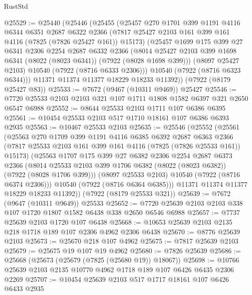 \begin{lexlean}{RustStd}
\begin{coremodule}
@25529 := @25440
    (@25446
      (@25455
        (@25457
          @270
          @1701
          @399
          @1191
          @4116
          @6344
          @6351
          @2687
          @6322
          @2366
          (@7817 @25427 @2103 @161 @399 @161 @4116 (@7825 (@7826 @25427 @161)) @15173)
          (@25457
            @1699
            @175
            @399
            @27
            @6341
            @2306
            @2254
            @2687
            @6332
            @2366
            (@8014 @25427 @2103 @399 @1698 @6341 (@8022 (@8023 @6341)) (@7922 (@8028 @1698 @399)))
            (@8097 @25427 @2103)
            @10540
            (@7922 (@8716 @6333 @2306)))
          @10540
          (@7922 (@8716 @6323 @6344)))
        @11371
        @11374
        @11377
        @18229
        @18233
        @11392))
    (@7922 (@8179 @25427 @83))
@25533 := @7672 (@9467 (@10311 @9469)) @25427
@25546 := @7720 @25533 @2103 @2103 @321 @107 @1711 @1808 @1582 @6397 @321 @2650 @6547 @6988
@25552 := @8644 @25533 @2103 @1711 @107 @6386 @6395
@25561 := @10454 @25533 @2103 @517 @1710 @18161 @107 @6386 @6393 @2935
@25563 := @10467 @25533 @2103
@25635 := @25546
    (@25552
      (@25561
        (@25563
          @270
          @1709
          @399
          @1191
          @4116
          @6385
          @6392
          @2687
          @6363
          @2366
          (@7817 @25533 @2103 @161 @399 @161 @4116 (@7825 (@7826 @25533 @161)) @15173)
          (@25563
            @1707
            @175
            @399
            @27
            @6382
            @2306
            @2254
            @2687
            @6373
            @2366
            (@8014 @25533 @2103 @399 @1706 @6382 (@8022 (@8023 @6382)) (@7922 (@8028 @1706 @399)))
            (@8097 @25533 @2103)
            @10540
            (@7922 (@8716 @6374 @2306)))
          @10540
          (@7922 (@8716 @6364 @6385)))
        @11371
        @11374
        @11377
        @18229
        @18233
        @11392))
    (@7922 (@8179 @25533 @321))
@25639 := @7672 (@9647 (@10311 @9649)) @25533
@25652 := @7720 @25639 @2103 @2103 @338 @107 @1720 @1807 @1582 @6438 @338 @2650 @6546 @6988
@25657 := @7737 @25639 @2103 @1720 @107 @6438
@25668 := @10653 @25639 @2103 @2135 @218 @1718 @189 @107 @2306 @4962 @2306 @6438
@25670 := @8776 @25639 @2103
@25673 := @25670 @218 @107 @4962
@25675 := @7817 @25639 @2103
@25679 := @25675 @19 @107 @19 @4962
@25680 := @7826 @25639
@25686 := @25668 (@25673 (@25679 (@7825 (@25680 @19)) @18067))
@25698 := @10766 @25639 @2103 @2135 @10770 @4962 @1718 @189 @107 @6426 @6435 @2306 @2269
@25707 := @10454 @25639 @2103 @517 @1717 @18161 @107 @6426 @6433 @2935

\end{coremodule}
\end{lexlean}
